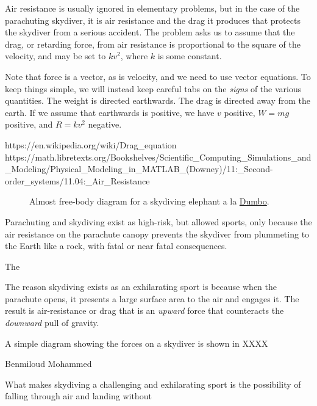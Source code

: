 \documentclass[
  a4paper,
]{article}
\begin{document}
Air resistance is usually ignored in elementary problems, but in the
case of the parachuting skydiver, it is air resistance and the drag it
produces that protects the skydiver from a serious accident. The problem
asks us to assume that the drag, or retarding force, from air resistance
is proportional to the square of the velocity, and may be set to
\(kv^2\), where \(k\) is some constant.

Note that force is a vector, as is velocity, and we need to use vector
equations. To keep things simple, we will instead keep careful tabs on
the \emph{signs} of the various quantities. The weight is directed
earthwards. The drag is directed away from the earth. If we assume that
earthwards is positive, we have \(v\) positive, \(W = mg\) positive, and
\(R = kv^2\) negative.

https://en.wikipedia.org/wiki/Drag\_equation
https://math.libretexts.org/Bookshelves/Scientific\_Computing\_Simulations\_and\_Modeling/Physical\_Modeling\_in\_MATLAB\_(Downey)/11:\_Second-order\_systems/11.04:\_Air\_Resistance

\begin{figure}
\centering

\caption[Almost free-body diagram for a skydiving elephant a la
\href{https://en.wikipedia.org/wiki/Dumbo}{Dumbo}.]{Almost free-body
diagram\footnotemark{} for a skydiving elephant a la
\href{https://en.wikipedia.org/wiki/Dumbo}{Dumbo}.}\label{fig:skydiver}
\end{figure}

Parachuting and skydiving exist as high-risk, but allowed sports, only
because the air resistance on the parachute canopy prevents the skydiver
from plummeting to the Earth like a rock, with fatal or near fatal
consequences.

The

The reason skydiving exists as an exhilarating sport is because when the
parachute opens, it presents a large surface area to the air and engages
it. The result is air-resistance or drag that is an \emph{upward} force
that counteracts the \emph{downward} pull of gravity.

A simple diagram showing the forces on a skydiver is shown in XXXX

Benmiloud Mohammed

What makes skydiving a challenging and exhilarating sport is the
possibility of falling through air and landing without
\end{document}
